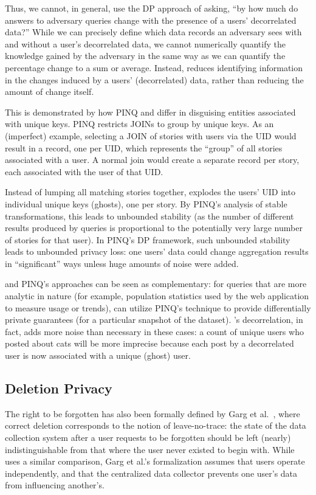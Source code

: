 Thus, we cannot, in general, use the DP approach of asking, ``by how much do answers to adversary
queries change with the presence of a users' decorrelated data?'' While we can precisely define which
data records an adversary sees with and without a user's decorrelated data, we cannot numerically
quantify the knowledge gained by the adversary in the same way as we can quantify the percentage
change to a sum or average.
Instead, \name reduces identifying information in the changes induced by a users' (decorrelated)
data, rather than reducing the amount of change itself.

This is demonstrated by how PINQ and \name differ in disguising entities associated with unique keys.
PINQ restricts JOINs to group by unique keys. As an (imperfect) example, selecting a JOIN of stories
with users via the UID would result in a record, one per UID, which represents the ``group'' of all
stories associated with a user. A normal join would create a separate record per story, each
associated with the user of that UID.

Instead of lumping all matching stories together, \name explodes the users' UID into individual
unique keys (ghosts), one per story. By PINQ's analysis of stable transformations, this leads to
unbounded stability (as the number of different results produced by queries is proportional to the
potentially very large number of stories for that user). In PINQ's DP framework, such unbounded
stability leads to unbounded privacy loss: one users' data could change aggregation results in
``significant'' ways unless huge amounts of noise were added.

\name and PINQ's approaches can be seen as complementary: for queries that are more analytic in nature (for example,
population statistics used by the web application to measure usage or trends), \name can utilize
PINQ's technique to provide differentially private guarantees (for a particular snapshot of the
dataset).  \name's decorrelation, in fact, adds more noise than necessary in these cases: a count
of unique users who posted about cats will be more imprecise because each post by a decorrelated
user is now associated with a unique (ghost) user.

\subsection{Deletion Privacy}
The right to be forgotten has also been formally defined by Garg et
al.~\cite{garg}, where correct deletion corresponds to the notion of
leave-no-trace: the state of the data collection system after a user requests to be forgotten should
be left (nearly) indistinguishable from that where the user never existed to begin with. While
\name uses a similar comparison, Garg et al.'s formalization assumes that users operate
independently, and that the centralized data collector prevents one user's data from influencing
another's.

